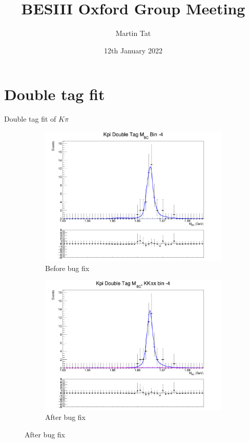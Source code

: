 \documentclass{beamer}
\title[BESIII Oxford]{BESIII Oxford Group Meeting}
\author{Martin Tat}
\institute{Oxford LHCb}
\date{12th January 2022}
\begin{document}
\begin{frame}
  \titlepage
\end{frame}


\section{Double tag fit}

\begin{frame}{Double tag fit of $K\pi$}
  \begin{figure}
    \centering
    \begin{subfigure}{0.49\textwidth}
      \centering
      \includegraphics[width=\textwidth]{Plots/DoubleTagYield_DoubleTag_Flavour_KKpipi_vs_Kpi_SignalBinM4_TagBin0_old.png}
      \caption{Before bug fix}
    \end{subfigure}%
    \begin{subfigure}{0.49\textwidth}
      \centering
      \includegraphics[width=\textwidth]{Plots/DoubleTagYield_DoubleTag_Flavour_KKpipi_vs_Kpi_SignalBinM4_TagBin0.png}
      \caption{After bug fix}
    \end{subfigure}
  \end{figure}
\end{frame}
\end{document}
